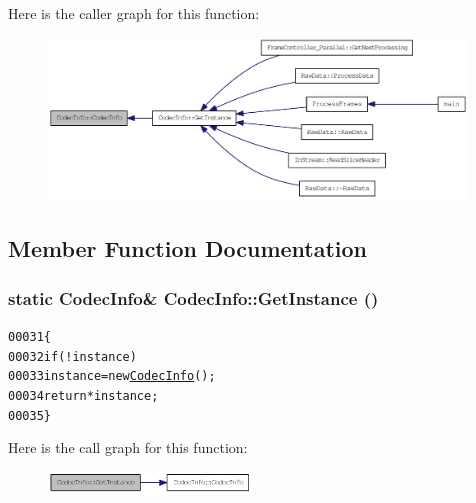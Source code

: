 Here is the caller graph for this function:\nopagebreak
\begin{figure}[H]
\begin{center}
\leavevmode
\includegraphics[width=315pt]{class_codec_info_ab2ecf673aaa2480fafb0b3d22896e4b6_icgraph}
\end{center}
\end{figure}




\subsection{Member Function Documentation}
\hypertarget{class_codec_info_ad439fd8062a03d868dfe9c9b615b747e}{
\subsubsection[{GetInstance}]{\setlength{\rightskip}{0pt plus 5cm}static {\bf CodecInfo}\& CodecInfo::GetInstance ()}}
\label{class_codec_info_ad439fd8062a03d868dfe9c9b615b747e}




\begin{footnotesize}\begin{alltt}
00031         \{
00032                 \textcolor{keywordflow}{if} (!instance)
00033                         instance = \textcolor{keyword}{new} \hyperlink{class_codec_info_ab2ecf673aaa2480fafb0b3d22896e4b6}{CodecInfo}();
00034                 \textcolor{keywordflow}{return} *instance;
00035         \}
\end{alltt}\end{footnotesize}




Here is the call graph for this function:\nopagebreak
\begin{figure}[H]
\begin{center}
\leavevmode
\includegraphics[width=153pt]{class_codec_info_ad439fd8062a03d868dfe9c9b615b747e_cgraph}
\end{center}
\end{figure}




